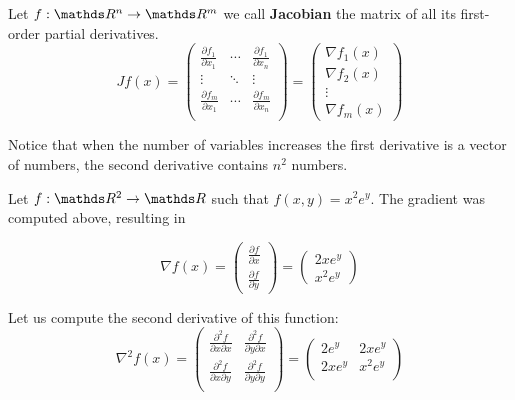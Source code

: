 \documentclass[computationalMathematics.tex]{subfiles}
\begin{document}
\begin{definition}[Jacobian]
  Let $f: \R^n \to \R^m$ we call \textbf{Jacobian} the matrix of all its first-order partial derivatives.
\[
  Jf(x) =
  \begin{pmatrix}
    \frac{\partial f_1}{\partial x_1} & \cdots & \frac{\partial f_1}{\partial x_n}\\
    \vdots & \ddots & \vdots\\
    \frac{\partial f_m}{\partial x_1} & \cdots & \frac{\partial f_m}{\partial x_n}\\
  \end{pmatrix}
  =
  \begin{pmatrix}
    \nabla f_1(x)\\
    \nabla f_2(x)\\
    \vdots\\
    \nabla f_m(x)
  \end{pmatrix}
\]
\end{definition}

Notice that when the number of variables increases the first derivative is a vector of numbers, the second derivative contains $n^2$ numbers.

\begin{example}
Let $f:\R^2 \to \R$ such that $f(x, y) = x^2 e^y$. The gradient was computed above, resulting in
  
\[
  \nabla f(x)
  =
  \begin{pmatrix}
    \frac{\partial f}{\partial x}\\
    \frac{\partial f}{\partial y} 
  \end{pmatrix}
  =
  \begin{pmatrix}
    2x e^y\\
    x^2 e^y
  \end{pmatrix}
\]

Let us compute the second derivative of this function:
\[
  \nabla^2 f(x)
  =
  \begin{pmatrix}
    \frac{\partial^2 f}{\partial x \partial x} & \frac{\partial^2 f}{\partial y \partial x}\\

    \frac{\partial^2 f}{\partial x \partial  y} & \frac{\partial^2 f}{\partial y \partial y}\\

  \end{pmatrix}
  =
  \begin{pmatrix}
    2 e^y & 2x e^y\\
    2x e^y & x^2 e^y\\
  \end{pmatrix}
\]
\end{example}
\end{document}
